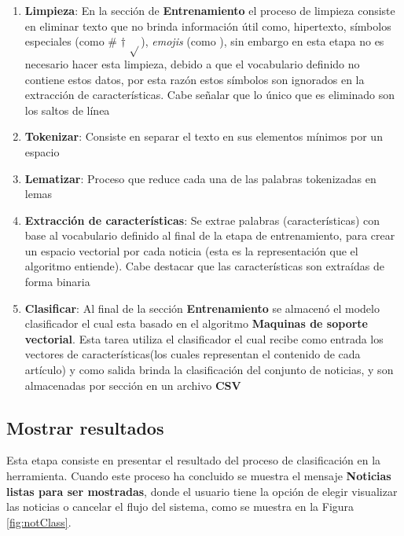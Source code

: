 \begin{enumerate}

	\item \textbf{Limpieza}: En la sección de \textbf{Entrenamiento} el proceso de limpieza consiste en eliminar texto que no brinda información útil como, hipertexto, símbolos especiales (como \# $\dagger$ $\sqrt{ }$), \textit{emojis} (como \dSmiley \dCooley \dNinja), sin embargo en esta etapa no es necesario hacer esta limpieza, debido a que el vocabulario definido no contiene estos datos, por esta razón estos símbolos son ignorados en la extracción de características. Cabe señalar que lo único que es eliminado son los saltos de línea

	\item \textbf{Tokenizar}: Consiste en separar el texto en sus elementos mínimos por un espacio 

	\item \textbf{Lematizar}: Proceso que reduce cada una de las palabras tokenizadas en lemas

	\item \textbf{Extracción de características}: Se extrae palabras (características) con base al vocabulario definido al final de la etapa de entrenamiento, para crear un espacio vectorial por cada noticia (esta es la representación que el algoritmo entiende). Cabe destacar que las características son extraídas de forma binaria

	\item \textbf{Clasificar}: Al final de la sección \textbf{Entrenamiento} se almacenó el modelo clasificador el cual esta basado en el algoritmo \textbf{Maquinas de soporte vectorial}. Esta tarea utiliza el clasificador el cual recibe como entrada los vectores de características(los cuales representan el contenido de cada artículo) y como salida brinda la clasificación del conjunto de noticias, y son almacenadas por sección en un archivo \textbf{CSV}

\end{enumerate}


\subsection{Mostrar resultados}

Esta etapa consiste en presentar el resultado del proceso de clasificación en la herramienta. Cuando este proceso ha concluido se muestra el mensaje \textbf{Noticias listas para ser mostradas}, donde el usuario tiene la opción de elegir visualizar las noticias o cancelar el flujo del sistema, como se muestra en la Figura \ref{fig:notClass}.

